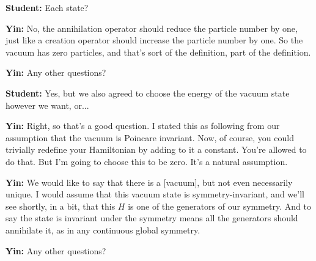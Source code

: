 \noindent\textbf{Student:} Each state?\par
\noindent\textbf{Yin:} No, the annihilation operator should reduce the particle number by one, just like a creation operator should increase the particle number by one. So the vacuum has zero particles, and that's sort of the definition, part of the definition.\par

\noindent\textbf{Yin:} Any other questions?\par
\noindent\textbf{Student:} Yes, but we also agreed to choose the energy of the vacuum state however we want, or...\par
\noindent\textbf{Yin:} Right, so that's a good question. I stated this as following from our assumption that the vacuum is Poincare invariant. Now, of course, you could trivially redefine your Hamiltonian by adding to it a constant. You're allowed to do that. But I'm going to choose this to be zero. It's a natural assumption.\par

\noindent\textbf{Yin:} We would like to say that there is a [vacuum], but not even necessarily unique. I would assume that this vacuum state is symmetry-invariant, and we'll see shortly, in a bit, that this $H$ is one of the generators of our symmetry. And to say the state is invariant under the symmetry means all the generators should annihilate it, as in any continuous global symmetry.\par

\noindent\textbf{Yin:} Any other questions?\par

